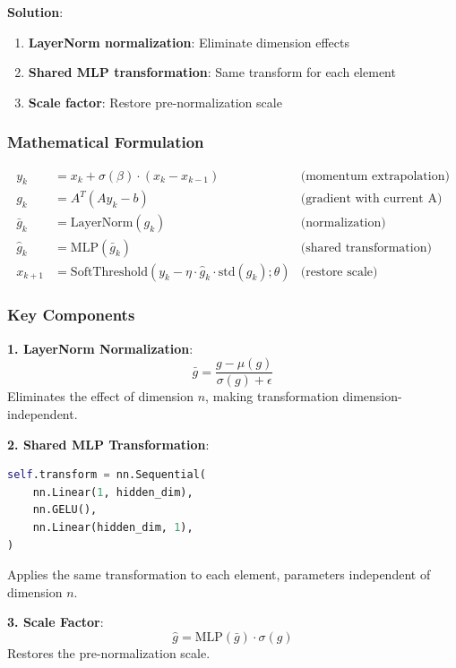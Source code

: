 \documentclass[11pt,a4paper]{article}
\begin{document}
\textbf{Solution}:
\begin{enumerate}
    \item \textbf{LayerNorm normalization}: Eliminate dimension effects
    \item \textbf{Shared MLP transformation}: Same transform for each element
    \item \textbf{Scale factor}: Restore pre-normalization scale
\end{enumerate}

\subsubsection{Mathematical Formulation}

\begin{equation}
\boxed{
\begin{aligned}
y_k &= x_k + \sigma(\beta) \cdot (x_k - x_{k-1}) & \text{(momentum extrapolation)} \\
g_k &= A^T(A y_k - b) & \text{(gradient with current A)} \\
\bar{g}_k &= \text{LayerNorm}(g_k) & \text{(normalization)} \\
\hat{g}_k &= \text{MLP}(\bar{g}_k) & \text{(shared transformation)} \\
x_{k+1} &= \text{SoftThreshold}(y_k - \eta \cdot \hat{g}_k \cdot \text{std}(g_k); \theta) & \text{(restore scale)}
\end{aligned}
}
\end{equation}

\subsubsection{Key Components}

\textbf{1. LayerNorm Normalization}:
\begin{equation}
    \bar{g} = \frac{g - \mu(g)}{\sigma(g) + \epsilon}
\end{equation}
Eliminates the effect of dimension $n$, making transformation dimension-independent.

\textbf{2. Shared MLP Transformation}:
\begin{lstlisting}[language=Python]
self.transform = nn.Sequential(
    nn.Linear(1, hidden_dim),
    nn.GELU(),
    nn.Linear(hidden_dim, 1),
)
\end{lstlisting}
Applies the same transformation to each element, parameters independent of dimension $n$.

\textbf{3. Scale Factor}:
\begin{equation}
    \hat{g} = \text{MLP}(\bar{g}) \cdot \sigma(g)
\end{equation}
Restores the pre-normalization scale.
\end{document}
